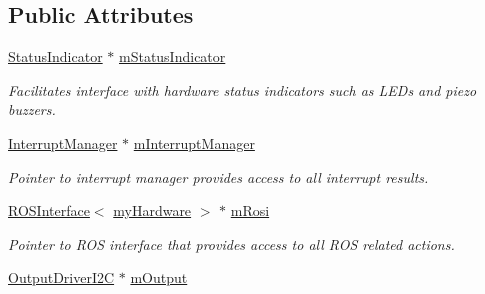\subsection*{Public Attributes}
\begin{DoxyCompactItemize}
\item 
\hyperlink{classSPMB_1_1StatusIndicator}{Status\+Indicator} $\ast$ \hyperlink{classSPMB_1_1StateMachine_a12dab063883dbefcd89e374090ccdc58}{m\+Status\+Indicator}\hypertarget{classSPMB_1_1StateMachine_a12dab063883dbefcd89e374090ccdc58}{}\label{classSPMB_1_1StateMachine_a12dab063883dbefcd89e374090ccdc58}

\begin{DoxyCompactList}\small\item\em Facilitates interface with hardware status indicators such as L\+E\+Ds and piezo buzzers. \end{DoxyCompactList}\item 
\hyperlink{classSPMB_1_1InterruptManager}{Interrupt\+Manager} $\ast$ \hyperlink{classSPMB_1_1StateMachine_a3e5c36f8ceb94e6f8913e7475cce2c40}{m\+Interrupt\+Manager}\hypertarget{classSPMB_1_1StateMachine_a3e5c36f8ceb94e6f8913e7475cce2c40}{}\label{classSPMB_1_1StateMachine_a3e5c36f8ceb94e6f8913e7475cce2c40}

\begin{DoxyCompactList}\small\item\em Pointer to interrupt manager provides access to all interrupt results. \end{DoxyCompactList}\item 
\hyperlink{classSPMB_1_1ROSInterface}{R\+O\+S\+Interface}$<$ \hyperlink{namespaceSPMB_a3dfee893976eb910fb3de34c228c2314}{my\+Hardware} $>$ $\ast$ \hyperlink{classSPMB_1_1StateMachine_ab653add6890a51701f9d3a3760008e15}{m\+Rosi}\hypertarget{classSPMB_1_1StateMachine_ab653add6890a51701f9d3a3760008e15}{}\label{classSPMB_1_1StateMachine_ab653add6890a51701f9d3a3760008e15}

\begin{DoxyCompactList}\small\item\em Pointer to R\+OS interface that provides access to all R\+OS related actions. \end{DoxyCompactList}\item 
\hyperlink{classSPMB_1_1OutputDriverI2C}{Output\+Driver\+I2C} $\ast$ \hyperlink{classSPMB_1_1StateMachine_aecac5b27c3a5daa5331d367f55bed915}{m\+Output}\hypertarget{classSPMB_1_1StateMachine_aecac5b27c3a5daa5331d367f55bed915}{}\label{classSPMB_1_1StateMachine_aecac5b27c3a5daa5331d367f55bed915}


\end{DoxyCompactItemize}
